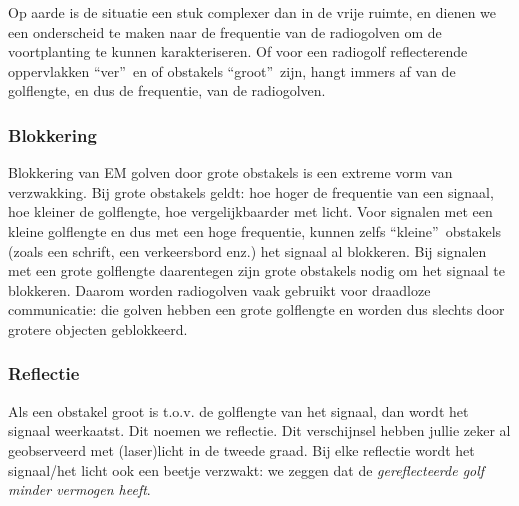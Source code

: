 Op aarde is de situatie een stuk complexer dan in de vrije ruimte, en dienen we een onderscheid te maken naar de frequentie van de radiogolven om de voortplanting te kunnen karakteriseren. Of voor een radiogolf reflecterende oppervlakken \textquotedblleft ver\textquotedblright \ en of obstakels \textquotedblleft groot\textquotedblright \ zijn, hangt immers af van de golflengte, en dus de frequentie, van de radiogolven.

\subsubsection{Blokkering}
Blokkering van EM golven door grote obstakels is een extreme vorm van verzwakking. Bij grote obstakels geldt: hoe hoger de frequentie van een signaal, hoe kleiner de golflengte, hoe vergelijkbaarder met licht. Voor signalen met een kleine golflengte en dus met een hoge frequentie, kunnen zelfs \textquotedblleft kleine\textquotedblright \ obstakels (zoals een schrift, een verkeersbord enz.) het signaal al blokkeren. Bij signalen met een grote golflengte daarentegen zijn grote obstakels nodig om het signaal te blokkeren. Daarom worden radiogolven vaak gebruikt voor draadloze communicatie: die golven hebben een grote golflengte en worden dus slechts door grotere objecten geblokkeerd.

\subsubsection{Reflectie}

Als een obstakel groot is t.o.v. de golflengte van het signaal, dan wordt het signaal weerkaatst. Dit noemen we reflectie. Dit verschijnsel hebben jullie zeker al geobserveerd met (laser)licht in de tweede graad. Bij elke reflectie wordt het signaal/het licht ook een beetje verzwakt: we zeggen dat de \emph{gereflecteerde golf minder vermogen heeft}.

\begin{center}
\end{center}

